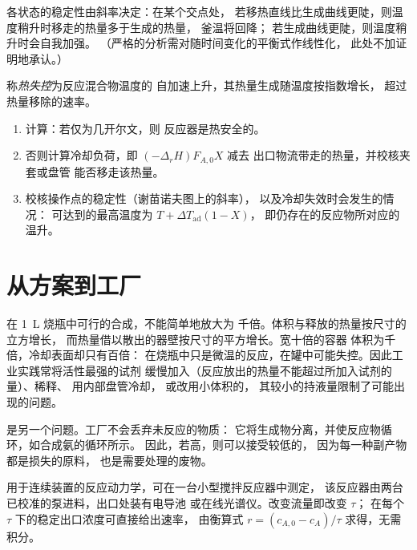 各状态的稳定性由斜率决定：在某个交点处，
若移热直线比生成曲线更陡，则温度稍升时移走的热量多于生成的热量，
釜温将回降；
若生成曲线更陡，则温度稍升时会自我加强。
（严格的分析需对随时间变化的平衡式作线性化，
此处不加证明地承认。）

\begin{definition}[热失控]\label{def:b2:continuous-reactors:runaway}
称\emph{热失控}为反应混合物温度的
自加速上升，其热量生成随温度按指数增长，
超过热量移除的速率。
\end{definition}

\begin{method}[反应器的热量衡算]\label{met:b2:continuous-reactors:heat-balance}
\begin{enumerate}
  \item 计算：若仅为几开尔文，则
        反应器是热安全的。
  \item 否则计算冷却负荷，即 $(-\Delta_r H)F_{A,0}X$ 减去
        出口物流带走的热量，并校核夹套或盘管
        能否移走该热量。
  \item 校核操作点的稳定性（谢苗诺夫图上的斜率），
        以及冷却失效时会发生的情况：
        可达到的最高温度为 $T + \Delta T_{\text{ad}}(1 - X)$，
        即仍存在的反应物所对应的温升。
\end{enumerate}
\end{method}

\section{从方案到工厂}

在 \qty{1}{L} 烧瓶中可行的合成，不能简单地放大为
千倍。体积与释放的热量按尺寸的立方增长，
而热量借以散出的器壁按尺寸的平方增长。宽十倍的容器
体积为千倍，冷却表面却只有百倍：
在烧瓶中只是微温的反应，在罐中可能失控。因此工业实践常将活性最强的试剂
缓慢加入（反应放出的热量不能超过所加入试剂的量）、稀释、
用内部盘管冷却，
或改用小体积的，
其较小的持液量限制了可能出现的问题。

是另一个问题。工厂不会丢弃未反应的物质：
它将生成物分离，并使反应物循环，如合成氨的循环所示。
因此，若高，则可以接受较低的，
因为每一种副产物都是损失的原料，
也是需要处理的废物。

\begin{inthelab}[实验台上的搅拌釜]
用于连续装置的反应动力学，可在一台小型搅拌反应器中测定，
该反应器由两台已校准的泵进料，出口处装有电导池
或在线光谱仪。改变流量即改变 $\tau$；
在每个 $\tau$ 下的稳定出口浓度可直接给出速率，
由衡算式 $r = (c_{A,0} - c_A)/\tau$ 求得，无需积分。
\end{inthelab}

